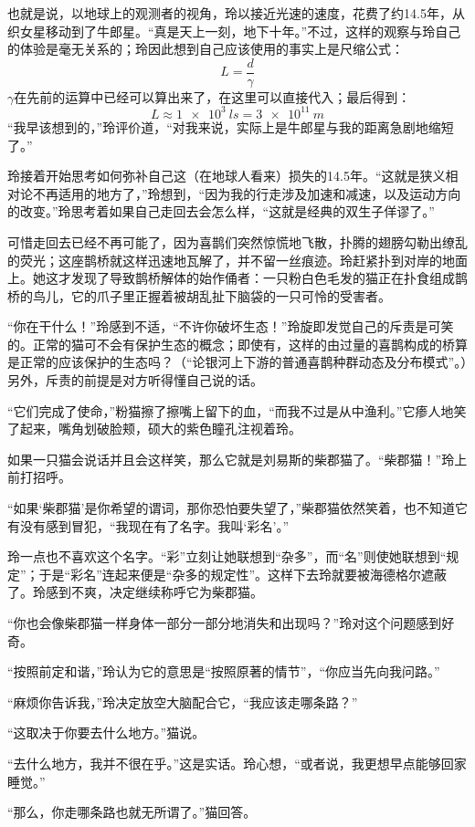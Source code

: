 也就是说，以地球上的观测者的视角，玲以接近光速的速度，花费了约14.5年，从织女星移动到了牛郎星。“真是天上一刻，地下十年。”不过，这样的观察与玲自己的体验是毫无关系的；玲因此想到自己应该使用的事实上是尺缩公式：
\[
L = \frac{d}{\gamma}
\]
\(\gamma\)在先前的运算中已经可以算出来了，在这里可以直接代入；最后得到：
\[
L \approx \qty{1e3}{ls} = \qty{3e11}{m}
\]
“我早该想到的，”玲评价道，“对我来说，实际上是牛郎星与我的距离急剧地缩短了。”

玲接着开始思考如何弥补自己这（在地球人看来）损失的14.5年。“这就是狭义相对论不再适用的地方了，”玲想到，“因为我的行走涉及加速和减速，以及运动方向的改变。”玲思考着如果自己走回去会怎么样，“这就是经典的双生子佯谬了。”

可惜走回去已经不再可能了，因为喜鹊们突然惊慌地飞散，扑腾的翅膀勾勒出缭乱的荧光；这座鹊桥就这样迅速地瓦解了，并不留一丝痕迹。玲赶紧扑到对岸的地面上。她这才发现了导致鹊桥解体的始作俑者：一只粉白色毛发的猫正在扑食组成鹊桥的鸟儿，它的爪子里正握着被胡乱扯下脑袋的一只可怜的受害者。

“你在干什么！”玲感到不适，“不许你破坏生态！”玲旋即发觉自己的斥责是可笑的。正常的猫可不会有保护生态的概念；即使有，这样的由过量的喜鹊构成的桥算是正常的应该保护的生态吗？（“论银河上下游的普通喜鹊种群动态及分布模式”。）另外，斥责的前提是对方听得懂自己说的话。

“它们完成了使命，”粉猫擦了擦嘴上留下的血，“而我不过是从中渔利。”它瘆人地笑了起来，嘴角划破脸颊，硕大的紫色瞳孔注视着玲。

如果一只猫会说话并且会这样笑，那么它就是刘易斯的柴郡猫了。“柴郡猫！”玲上前打招呼。

“如果‘柴郡猫’是你希望的谓词，那你恐怕要失望了，”柴郡猫依然笑着，也不知道它有没有感到冒犯，“我现在有了名字。我叫‘彩名’。”

玲一点也不喜欢这个名字。“彩”立刻让她联想到“杂多”，而“名”则使她联想到“规定”；于是“彩名”连起来便是“杂多的规定性”。这样下去玲就要被海德格尔遮蔽了。玲感到不爽，决定继续称呼它为柴郡猫。

“你也会像柴郡猫一样身体一部分一部分地消失和出现吗？”玲对这个问题感到好奇。

“按照前定和谐，”玲认为它的意思是“按照原著的情节”，“你应当先向我问路。”

“麻烦你告诉我，”玲决定放空大脑配合它，“我应该走哪条路？”

“这取决于你要去什么地方。”猫说。

“去什么地方，我并不很在乎。”这是实话。玲心想，“或者说，我更想早点能够回家睡觉。”

“那么，你走哪条路也就无所谓了。”猫回答。

